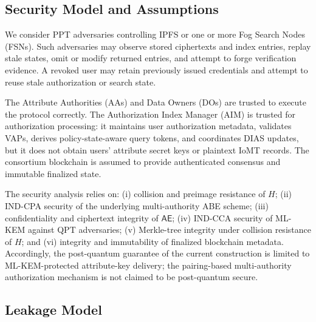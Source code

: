\documentclass{ieeetj}
\theoremstyle{ieee-style}
\begin{document}
\subsection{Security Model and Assumptions}

We consider PPT adversaries controlling IPFS or one or more Fog Search
Nodes (FSNs). Such adversaries may observe stored ciphertexts and index
entries, replay stale states, omit or modify returned entries, and attempt
to forge verification evidence. A revoked user may retain previously
issued credentials and attempt to reuse stale authorization or search
state.

The Attribute Authorities (AAs) and Data Owners (DOs) are trusted to
execute the protocol correctly. The Authorization Index Manager (AIM) is
trusted for authorization processing: it maintains user authorization
metadata, validates VAPs, derives policy-state-aware query tokens, and
coordinates DIAS updates, but it does not obtain users' attribute secret
keys or plaintext IoMT records. The consortium blockchain is assumed to
provide authenticated consensus and immutable finalized state.

The security analysis relies on: (i) collision and preimage resistance
of $H$; (ii) IND-CPA security of the underlying multi-authority ABE
scheme; (iii) confidentiality and ciphertext integrity of
$\mathsf{AE}$; (iv) IND-CCA security of ML-KEM against QPT adversaries;
(v) Merkle-tree integrity under collision resistance of $H$; and
(vi) integrity and immutability of finalized blockchain metadata.
Accordingly, the post-quantum guarantee of the current construction is
limited to ML-KEM-protected attribute-key delivery; the pairing-based
multi-authority authorization mechanism is not claimed to be
post-quantum secure.

\subsection{Leakage Model}
\end{document}
